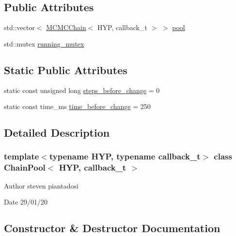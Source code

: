 \subsection*{Public Attributes}
\begin{DoxyCompactItemize}
\item 
std\+::vector$<$ \hyperlink{class_m_c_m_c_chain}{M\+C\+M\+C\+Chain}$<$ H\+YP, callback\+\_\+t $>$ $>$ \hyperlink{class_chain_pool_af89400f6e9a2312fe2ee7873745a6e91}{pool}
\item 
std\+::mutex \hyperlink{class_chain_pool_a6efe006156a22132b452d50dab9f76c0}{running\+\_\+mutex}
\end{DoxyCompactItemize}
\subsection*{Static Public Attributes}
\begin{DoxyCompactItemize}
\item 
static const unsigned long \hyperlink{class_chain_pool_a143f3e4f9b60c03c67ffbc2db3e57d53}{steps\+\_\+before\+\_\+change} = 0
\item 
static const time\+\_\+ms \hyperlink{class_chain_pool_a1ff48aa1e09a9a31871dec05d3c0e9d3}{time\+\_\+before\+\_\+change} = 250
\end{DoxyCompactItemize}


\subsection{Detailed Description}
\subsubsection*{template$<$typename H\+YP, typename callback\+\_\+t$>$\newline
class Chain\+Pool$<$ H\+Y\+P, callback\+\_\+t $>$}

\begin{DoxyAuthor}{Author}
steven piantadosi 
\end{DoxyAuthor}
\begin{DoxyDate}{Date}
29/01/20 
\end{DoxyDate}


\subsection{Constructor \& Destructor Documentation}
\mbox{\label{class_chain_pool_ae8795a9a7c0fff45c82334fa821c8c3c}} 
